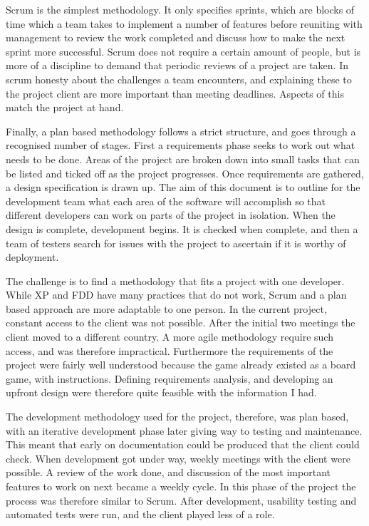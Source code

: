 Scrum is the simplest methodology. It only specifies sprints, which are blocks of time which a team takes to implement a number of features before reuniting with management to review the work completed and discuss how to make the next sprint more successful. Scrum does not require a certain amount of people, but is more of a discipline to demand that periodic reviews of a project are taken. In scrum honesty about the challenges a team encounters, and explaining these to the project client are more important than meeting deadlines. Aspects of this match the project at hand.
	
Finally, a plan based methodology follows a strict structure, and goes through a recognised number of stages. First a requirements phase seeks to work out what needs to be done. Areas of the project are broken down into small tasks that can be listed and ticked off as the project progresses. Once requirements are gathered, a design specification is drawn up. The aim of this document is to outline for the development team what each area of the software will accomplish so that different developers can work on parts of the project in isolation. When the design is complete, development begins. It is checked when complete, and then a team of testers search for issues with the project to ascertain if it is worthy of deployment.
	
The challenge is to find a methodology that fits a project with one developer. While XP and FDD have many practices that do not work, Scrum and a plan based approach are more adaptable to one person. In the current project, constant access to the client was not possible. After the initial two meetings the client moved to a different country. A more agile methodology require such access, and was therefore impractical. Furthermore the requirements of the project were fairly well understood because the game already existed as a board game, with instructions. Defining requirements analysis, and developing an upfront design were therefore quite feasible with the information I had.
	
The development methodology used for the project, therefore, was plan based, with an iterative development phase later giving way to testing and maintenance. This meant that early on documentation could be produced that the client could check. When development got under way, weekly meetings with the client were possible. A review of the work done, and discussion of the most important features to work on next became a weekly cycle. In this phase of the project the process was therefore similar to Scrum. After development, usability testing and automated tests were run, and the client played less of a role.

